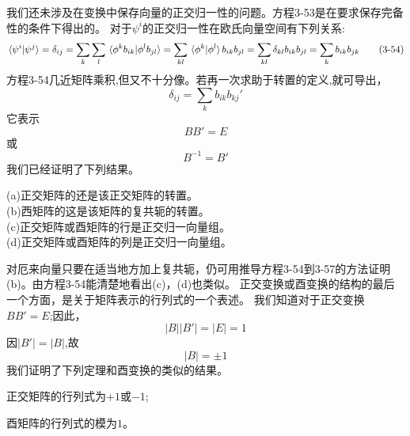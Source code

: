 我们还未涉及在变换中保存向量的正交归一性的问题。方程3-53是在要求保存完备性的条件下得出的。
对于$\psi^i$的正交归一性在欧氏向量空间有下列关系:
\[\bra*{\psi^i}\ket*{\psi^j}=\delta_{ij}=\sum_k\sum_l\bra*{\phi^kb_{ik}}\ket*{\phi^lb_{jl}}=\sum_{kl}\bra*{\phi^k}\ket*{\phi^l}b_{ik}b_{jl}=\sum_{kl}\delta_{kl}b_{ik}b_{jl}=\sum_kb_{ik}b_{jk} \tag{3-54}\]
方程3-54几近矩阵乘积,但又不十分像。若再一次求助于转置的定义,就可导出，
\[\delta_{ij}=\sum_kb_{ik}b_{kj}' \tag{3-55}\]
它表示
\[BB'=E \tag{3-56}\]
或
\[B^{-1}=B' \tag{3-56}\]
我们已经证明了下列结果。

\begin{theorem}
    (a)正交矩阵的还是该正交矩阵的转置。\\
    (b)西矩阵的这是该矩阵的复共轭的转置。\\
    (c)正交矩阵或酉矩阵的行是正交归一向量组。\\
    (d)正交矩阵或酉矩阵的列是正交归一向量组。
\end{theorem}

对厄来向量只要在适当地方加上复共轭，仍可用推导方程3-54到3-57的方法证明(b)。由方程3-54能清楚地看出(c)，(d)也类似。
正交变换或酉变换的结构的最后一个方面，是关于矩阵表示的行列式的一个表述。
我们知道对于正交变换$BB'=E$;因此，
\[|B||B'|=|E|=1 \tag{3-58}\]
因$|B'|=|B|$,故
\[|B|= \pm 1 \tag{3-59}\]
我们证明了下列定理和酉变换的类似的结果。

\begin{theorem}
    正交矩阵的行列式为$+1$或$-1$;
    
    酉矩阵的行列式的模为$1$。
\end{theorem}

